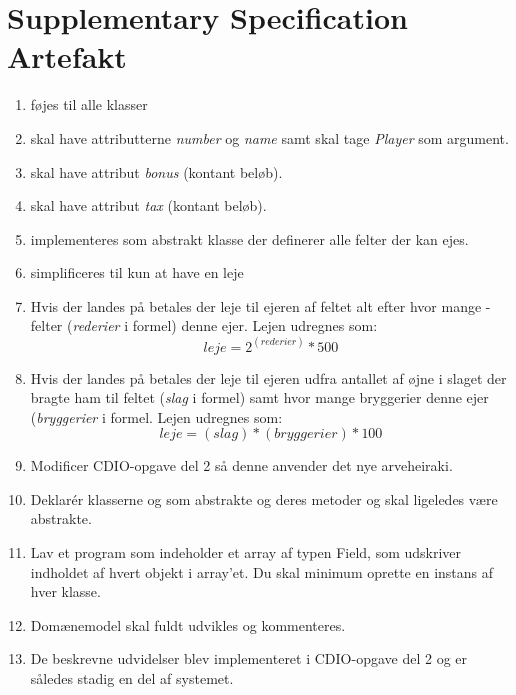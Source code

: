 \chapter{Supplementary Specification Artefakt}\label{chap:suppSpec}

\begin{enumerate}
\item {} føjes til alle klasser
\item {} skal have attributterne \textit{number} og \textit{name} samt  skal tage \textit{Player} som argument.
\item {} skal have attribut \textit{bonus} (kontant beløb).
\item {} skal have attribut \textit{tax} (kontant beløb).
\item {} implementeres som abstrakt klasse der definerer alle felter der kan ejes. 
\item {} simplificeres til kun at have en leje 
\item Hvis der landes på  betales der leje til ejeren af feltet alt efter hvor mange -felter (\textit{rederier} i formel) denne ejer. Lejen udregnes som: $$leje=2^{(rederier)}*500$$
\item Hvis der landes på  betales der leje til ejeren udfra antallet af øjne i slaget der bragte ham til feltet (\textit{slag} i formel) samt hvor mange bryggerier denne ejer (\textit{bryggerier} i formel. Lejen udregnes som: $$leje=(slag)*(bryggerier)*100$$
\item Modificer CDIO-opgave del 2 så denne anvender det nye arveheiraki.
\item Deklarér klasserne  og  som abstrakte og deres metoder  og  skal ligeledes være abstrakte.
\item Lav et program  som indeholder et array af typen Field, som udskriver indholdet af hvert objekt i array’et. Du skal minimum oprette en instans af hver klasse.
\item Domænemodel skal fuldt udvikles og kommenteres.  
\item De beskrevne udvidelser blev implementeret i CDIO-opgave del 2 og er således stadig en del af systemet. 
\end{enumerate}